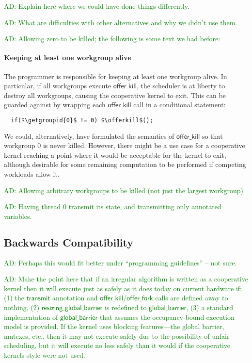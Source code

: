 \documentclass[numbers,nocopyrightspace,10pt]{sigplanconf}
\newcommand{\ADComment}[1]{\textcolor{green}{AD: #1}}
\newcommand{\transmit}{\mathsf{transmit}}
\newcommand{\offerfork}{\mathsf{offer\_fork}}
\newcommand{\offerkill}{\mathsf{offer\_kill}}
\newcommand{\globalbarrier}{\mathsf{global\_barrier}}
\newcommand{\resizingglobalbarrier}{\mathsf{resizing\_global\_barrier}}
\newcommand{\getgroupid}{\mathsf{get\_group\_id}}
\begin{document}
\ADComment{Explain here where we could have done things differently.}

\ADComment{What are difficulties with other alternatives and why we didn't use them.}

\ADComment{Allowing zero to be killed; the following is some text we had before:}

\paragraph{Keeping at least one workgroup alive}

The programmer is responsible for keeping at least one workgroup alive.  In particular, if all workgroups execute $\offerkill$, the scheduler is at liberty to destroy all workgroups, causing the cooperative kernel to exit.  This can be guarded against by wrapping each $\offerkill$ call in a conditional statement:

\lstset{basicstyle=\tt,numbers=none}
\begin{lstlisting}
  if($\getgroupid{0}$ != 0) $\offerkill$();
\end{lstlisting}
\lstset{basicstyle=\scriptsize\tt,numbers=left}

We could, alternatively, have formulated the semantics of $\offerkill$
so that workgroup 0 is never killed.  However, there might be a use
case for a cooperative kernel reaching a point where it would be
acceptable for the kernel to exit, although desirable for some
remaining computation to be performed if competing workloads allow it.



\ADComment{Allowing arbitrary workgroups to be killed (not just the largest workgroup)}

\ADComment{Having thread 0 transmit its state, and transmitting only annotated variables.}

\subsection{Backwards Compatibility}\label{sec:backwardscompatibility}

\ADComment{Perhaps this would fit better under ``programming guidelines'' -- not sure.}

\ADComment{Make the point here that if an irregular algorithm is
  written as a cooperative kernel then it will execute just as safely
  as it does today on current hardware if: (1) the $\transmit$
  annotation and $\offerkill$/$\offerfork$ calls are defined away to
  nothing, (2) $\resizingglobalbarrier$ is redefined to
  $\globalbarrier$, (3) a standard implementation of $\globalbarrier$
  that assumes the occupancy-bound execution model is provided.  If the kernel uses blocking features---the global barrier, mutexes, etc., then it may not execute safely due to the possibility of unfair scheduling, but it will execute no less safely than it would if the cooperative kernels style were not used.}
\end{document}
